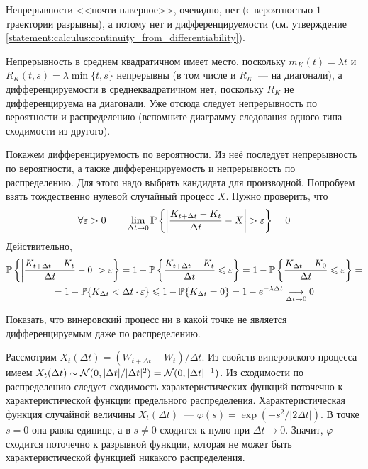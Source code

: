 \begin{solution}
    Непрерывности <<почти наверное>>, очевидно, нет (с вероятностью $ 1 $ траектории разрывны),
    а потому нет и дифференцируемости (см. утверждение \ref{statement:calculus:continuity_from_differentiability}).

    Непрерывность в среднем квадратичном имеет место, поскольку $ m_K(t) = \lambda t $ и $ R_K(t, s) = \lambda \min \{t, s\} $
    непрерывны (в том числе и $ R_K $~--- на диагонали), а дифференцируемости в среднеквадратичном нет,
    поскольку $ R_K $ не дифференцируема на диагонали.
    Уже отсюда следует непрерывность по вероятности и распределению (вспомните диаграмму следования одного типа сходимости из другого).

    Покажем дифференцируемость по вероятности.
    Из неё последует непрерывность по вероятности, а также дифференцируемость и непрерывность по распределению.
    Для этого надо выбрать кандидата для производной.
    Попробуем взять тождественно нулевой случайный процесс $ X $.
    Нужно проверить, что
    \[
        \forall \varepsilon > 0 \qquad \lim_{\Delta t \to 0} \mathbb{P} \left\{ \left| \frac{K_{t + \Delta t} - K_t}{\Delta t} - X \right| > \varepsilon \right\} = 0
    \]
    Действительно,
    \begin{multline*}
        \mathbb{P} \left\{ \left| \frac{K_{t + \Delta t} - K_t}{\Delta t} - 0 \right| > \varepsilon \right\} =
        1 - \mathbb{P} \left\{ \frac{K_{t + \Delta t} - K_t}{\Delta t} \leqslant \varepsilon \right\} =
        1 - \mathbb{P} \left\{ \frac{K_{\Delta t} - K_0}{\Delta t} \leqslant \varepsilon \right\} = \\
        = 1 - \mathbb{P} \{ K_{\Delta t} < \Delta t \cdot \varepsilon \} \leqslant 1 - \mathbb{P} \{ K_{\Delta t} = 0 \} = 1 - e^{- \lambda \Delta t} \underset{\Delta t \to 0}{\longrightarrow} 0
    \end{multline*}
\end{solution}


\begin{exercise}
    \label{exercise:calculus:Wiener_process_diffirentiability}
    Показать, что винеровский процесс ни в какой точке не является дифференцируемым даже по распределению.
\end{exercise}

\begin{solution}
    Рассмотрим $ X_t (\Delta t) = (W_{t + \Delta t} - W_t) / \Delta t $.
    Из свойств винеровского процесса имеем $ X_t(\Delta t) \sim \mathcal{N}(0, |\Delta t| / |\Delta t|^2) = \mathcal{N}(0, |\Delta t|^{-1}) $.
    Из сходимости по распределению следует сходимость характеристических функций поточечно к характеристической функции предельного распределения.
    Характеристическая функция случайной величины $ X_t(\Delta t) $~--- $ \varphi(s) = \exp(- s^2 / |2 \Delta t|) $.
    В точке $ s = 0 $ она равна единице, а в $ s \neq 0 $ сходится к нулю при $ \Delta t \to 0 $.
    Значит, $ \varphi $ сходится поточечно к разрывной функции,
    которая не может быть характеристической функцией никакого распределения.
\end{solution}




